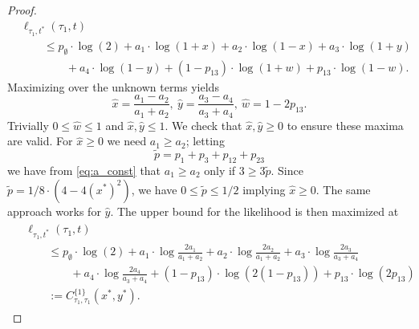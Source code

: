 \begin{proof}
\begin{equation*}
\begin{split}
&    \ell_{\tau_1,t^*}(\tau_1, t) \\
&\qquad \le      p_{\emptyset}  \cdot\log(2)
+ a_{1}\cdot\log(1+x)
+ a_{2}\cdot\log(1-x)
+ a_{3}\cdot\log(1+y) \\
&\qquad\qquad + a_{4}\cdot\log(1-y)
+ (1-p_{13})\cdot\log(1+w)
+ p_{13}\cdot\log(1-w).
\end{split}
\end{equation*}
Maximizing over the unknown terms yields
\[
\hat{x} = \frac{a_{1}-a_{2}}{a_{1}+a_{2}}, \ \hat{y} = \frac{a_{3}-a_{4}}{a_{3}+a_{4}}, \ \hat{w} = 1-2p_{13}.
\]
Trivially $0 \le \hat{w} \le 1$ and $\hat{x}, \hat{y} \le 1$.
We check that $\hat{x}, \hat{y} \ge 0$ to ensure these maxima are valid.
For $\hat{x} \ge 0$ we need $a_1 \ge a_2$; letting
\[
\tilde{p} = p_{1}+p_{3}+p_{12}+p_{23}
\]
we have from \eqref{eq:a_const} that $a_1 \ge a_2$ only if $3 \ge 3\tilde{p}$.
Since $\tilde{p} = 1/8\cdot(4-4(x^*)^2)$, we have $0 \le \tilde{p} \le 1/2$ implying $\hat{x} \ge 0$.
The same approach works for $\hat{y}$.
The upper bound for the likelihood is then maximized at
\begin{align}
\begin{split}
&    \ell_{\tau_1,t^*}(\tau_1, t) \\
&\qquad\le      p_{\emptyset}  \cdot\log(2)
+ a_{1}\cdot\log\frac{2a_{1}}{a_{1}+a_{2}}
+ a_{2}\cdot\log\frac{2a_{2}}{a_{1}+a_{2}}
+ a_{3}\cdot\log\frac{2a_{3}}{a_{3}+a_{4}} \\
&\qquad\qquad + a_{4}\cdot\log\frac{2a_{4}}{a_{3}+a_{4}}
+ (1-p_{13})\cdot\log(2(1-p_{13}))
+ p_{13}\cdot\log(2p_{13}) \\
&\qquad := C^{\{1\}}_{\tau_1,\tau_1}(x^*, y^*).
\end{split}
\label{eq:farris-upper-bound-1}
\end{align}


\end{proof}

